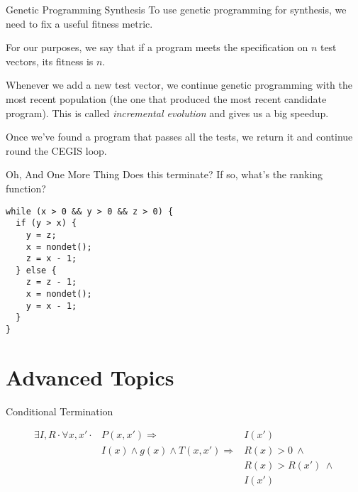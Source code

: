 \documentclass[xcolor=pdftex,t,11pt]{beamer}
\begin{document}
\begin{frame}{Genetic Programming Synthesis}
To use genetic programming for synthesis, we need to fix a useful fitness metric.

\vspace{1em}

For our purposes, we say that if a program meets the specification on $n$ test vectors, its
fitness is $n$.

Whenever we add a new test vector, we continue genetic programming with the most recent population
(the one that produced the most recent candidate program).  This is called \emph{incremental evolution}
and gives us a big speedup.

\vspace{1em}

Once we've found a program that passes all the tests, we return it and continue round the CEGIS
loop.
\end{frame}

\begin{frame}[fragile]{Oh, And One More Thing}
Does this terminate?  If so, what's the ranking function?

\begin{lstlisting}[basicstyle=\normalsize]
while (x > 0 && y > 0 && z > 0) {
  if (y > x) {
    y = z;
    x = nondet();
    z = x - 1;
  } else {
    z = z - 1;
    x = nondet();
    y = x - 1;
  }
}
\end{lstlisting}
\end{frame}


\section{Advanced Topics}
\begin{frame}{Conditional Termination}

\begin{align*}
\exists I, R \cdot \forall x, x' \cdot & P(x, x') \Rightarrow & I(x') \\
                                       & I(x) \wedge g(x) \wedge T(x, x') \Rightarrow & R(x) > 0 ~ \wedge \\
                                       & & R(x) > R(x') ~ \wedge \\
                                       & & I(x')
\end{align*}
\end{frame}
\end{document}
